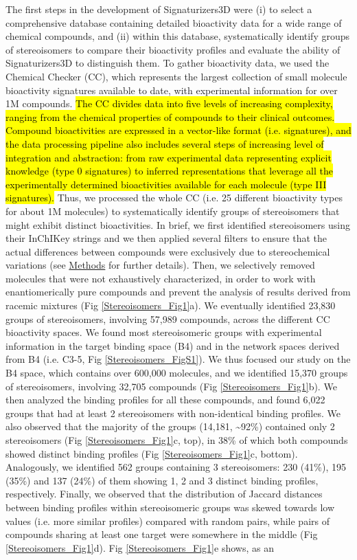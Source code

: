 The first steps in the development of Signaturizers3D were (i) to select a comprehensive database containing detailed bioactivity data for a wide range of chemical compounds, and (ii) within this database, systematically identify groups of stereoisomers to compare their bioactivity profiles and evaluate the ability of Signaturizers3D to distinguish them.
To gather bioactivity data, we used the Chemical Checker (CC), which represents the largest collection of small molecule bioactivity signatures available to date, with experimental information for over 1M compounds\cite{duran-frigola_extending_2020}. \hl{The CC divides data into five levels of increasing complexity, ranging from the chemical properties of compounds to their clinical outcomes. Compound bioactivities are expressed in a vector-like format (i.e. signatures), and the data processing pipeline also includes several steps of increasing level of integration and abstraction: from raw experimental data representing explicit knowledge (type 0 signatures) to inferred representations that leverage all the experimentally determined bioactivities available for each molecule (type III signatures).} Thus, we processed the whole CC (i.e. 25 different bioactivity types for about 1M molecules) to systematically identify groups of stereoisomers that might exhibit distinct bioactivities. In brief, we first identified stereoisomers using their InChIKey strings and we then applied several filters to ensure that the actual differences between compounds were exclusively due to stereochemical variations (see \hyperref[Stereoisomers_Methods]{Methods} for further details). Then, we selectively removed molecules that were not exhaustively characterized, in order to work with enantiomerically pure compounds and prevent the analysis of results derived from racemic mixtures (Fig \ref{Stereoisomers_Fig1}a). We eventually identified 23,830 groups of stereoisomers, involving 57,989 compounds, across the different CC bioactivity spaces. We found most stereoisomeric groups with experimental information in the target binding space (B4) and in the network spaces derived from B4 (i.e. C3-5, Fig \ref{Stereoisomers_FigS1}). We thus focused our study on the B4 space, which contains over 600,000 molecules, and we identified 15,370 groups of stereoisomers, involving 32,705 compounds (Fig \ref{Stereoisomers_Fig1}b). We then analyzed the binding profiles for all these compounds, and found 6,022 groups that had at least 2 stereoisomers with non-identical binding profiles. We also observed that the majority of the groups (14,181, \textasciitilde92\%) contained only 2 stereoisomers (Fig \ref{Stereoisomers_Fig1}c, top), in 38\% of which both compounds showed distinct binding profiles (Fig \ref{Stereoisomers_Fig1}c, bottom). Analogously, we identified 562 groups containing 3 stereoisomers: 230 (41\%), 195 (35\%) and 137 (24\%) of them showing 1, 2 and 3 distinct binding profiles, respectively. Finally, we observed that the distribution of Jaccard distances between binding profiles within stereoisomeric groups was skewed towards low values (i.e. more similar profiles) compared with random pairs, while pairs of compounds sharing at least one target were somewhere in the middle (Fig \ref{Stereoisomers_Fig1}d). Fig \ref{Stereoisomers_Fig1}e shows, as an 